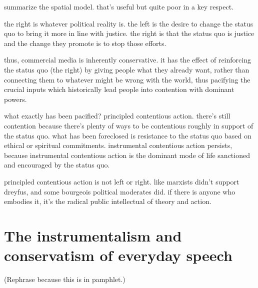 \documentclass[12pt,book]{article}
\begin{document}
summarize the spatial model. that's useful but quite poor in a key
respect.

the right is whatever political reality is. the left is the desire to
change the status quo to bring it more in line with justice. the right
is that the status quo is justice and the change they promote is to stop
those efforts.

thus, commercial media is inherently conservative. it has the effect of
reinforcing the status quo (the right) by giving people what they
already want, rather than connecting them to whatever might be wrong
with the world, thus pacifying the crucial inputs which historically
lead people into contention with dominant powers.

what exactly has been pacified? principled contentious action. there's
still contention because there's plenty of ways to be contentious
roughly in support of the status quo. what has been foreclosed is
resistance to the status quo based on ethical or spiritual commitments.
instrumental contentious action persists, because instrumental
contentious action is the dominant mode of life sanctioned and
encouraged by the status quo.

principled contentious action is not left or right. like marxists didn't
support dreyfus, and some bourgeois political moderates did. if there is
anyone who embodies it, it's the radical public intellectual of theory
and action.

\section{The instrumentalism and conservatism of everyday
speech}\label{the-instrumentalism-and-conservatism-of-everyday-speech}

(Rephrase because this is in pamphlet.)
\end{document}
